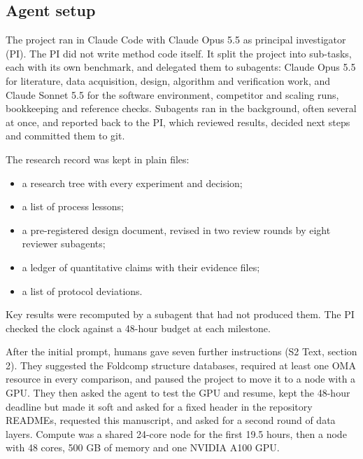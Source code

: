 \documentclass[10pt,letterpaper]{article}
\begin{document}
\subsection*{Agent setup}
The project ran in Claude Code with Claude Opus 5.5 as principal investigator (PI). The PI did not write method code itself. It split the project into sub-tasks, each with its own benchmark, and delegated them to subagents: Claude Opus 5.5 for literature, data acquisition, design, algorithm and verification work, and Claude Sonnet 5.5 for the software environment, competitor and scaling runs, bookkeeping and reference checks. Subagents ran in the background, often several at once, and reported back to the PI, which reviewed results, decided next steps and committed them to git.

The research record was kept in plain files:
\begin{itemize}
\item a research tree with every experiment and decision;
\item a list of process lessons;
\item a pre-registered design document, revised in two review rounds by eight reviewer subagents;
\item a ledger of quantitative claims with their evidence files;
\item a list of protocol deviations.
\end{itemize}
Key results were recomputed by a subagent that had not produced them. The PI checked the clock against a 48-hour budget at each milestone.

After the initial prompt, humans gave seven further instructions (S2 Text, section 2). They suggested the Foldcomp structure databases, required at least one OMA resource in every comparison, and paused the project to move it to a node with a GPU. They then asked the agent to test the GPU and resume, kept the 48-hour deadline but made it soft and asked for a fixed header in the repository READMEs, requested this manuscript, and asked for a second round of data layers. Compute was a shared 24-core node for the first 19.5 hours, then a node with 48 cores, 500 GB of memory and one NVIDIA A100 GPU.
\end{document}
